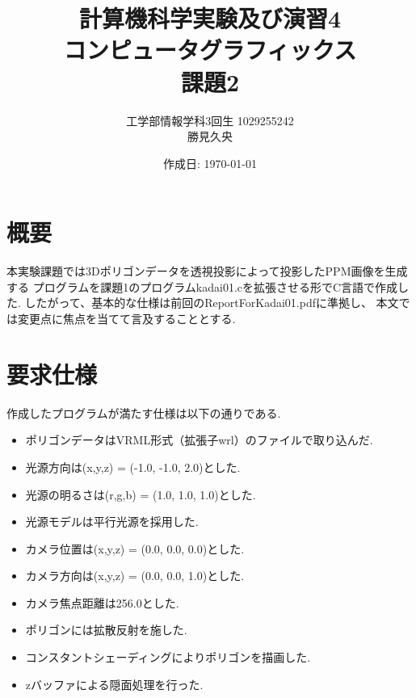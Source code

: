 \documentclass[a4j,dvipdfmx]{jsarticle}
\begin{document}
\title{計算機科学実験及び演習4\\コンピュータグラフィックス\\課題2}
\author{工学部情報学科3回生 1029255242\\勝見久央}
\date{作成日: \today} %
\maketitle
\section{概要}
本実験課題では3Dポリゴンデータを透視投影によって投影したPPM画像を生成する
プログラムを課題1のプログラムkadai01.cを拡張させる形でC言語で作成した.
したがって、基本的な仕様は前回のReportForKadai01.pdfに準拠し、
本文では変更点に焦点を当てて言及することとする.

\section{要求仕様}
作成したプログラムが満たす仕様は以下の通りである.
\begin{itemize}
\item ポリゴンデータはVRML形式（拡張子wrl）のファイルで取り込んだ.
\item 光源方向は(x,y,z) = (-1.0, -1.0, 2.0)とした.
\item 光源の明るさは(r,g,b) = (1.0, 1.0, 1.0)とした.
\item 光源モデルは平行光源を採用した.
\item カメラ位置は(x,y,z) = (0.0, 0.0, 0.0)とした.
\item カメラ方向は(x,y,z) = (0.0, 0.0, 1.0)とした.
\item カメラ焦点距離は256.0とした.
\item ポリゴンには拡散反射を施した.
\item コンスタントシェーディングによりポリゴンを描画した.
\item zバッファによる隠面処理を行った.
\end{itemize}
\end{document}
